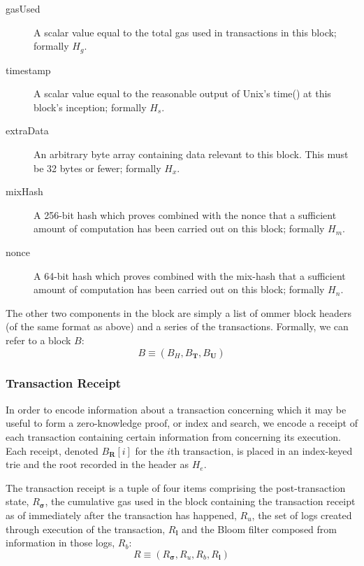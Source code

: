\documentclass[9pt,oneside]{amsart}
\begin{document}
\begin{multicols}{2}
\begin{description}
\item[gasUsed] A scalar value equal to the total gas used in transactions in this block; formally $H_g$.
\item[timestamp] A scalar value equal to the reasonable output of Unix's time() at this block's inception; formally $H_s$.
\item[extraData] An arbitrary byte array containing data relevant to this block. This must be 32 bytes or fewer; formally $H_x$.
\item[mixHash] A 256-bit hash which proves combined with the nonce that a sufficient amount of computation has been carried out on this block; formally $H_m$.
\item[nonce] A 64-bit hash which proves combined with the mix-hash that a sufficient amount of computation has been carried out on this block; formally $H_n$.
\end{description}

The other two components in the block are simply a list of ommer block headers (of the same format as above) and a series of the transactions. Formally, we can refer to a block $B$:
\begin{equation}
B \equiv (B_H, B_\mathbf{T}, B_\mathbf{U})
\end{equation}

\subsubsection{Transaction Receipt}

In order to encode information about a transaction concerning which it may be useful to form a zero-knowledge proof, or index and search, we encode a receipt of each transaction containing certain information from concerning its execution.
Each receipt, denoted $B_\mathbf{R}[i]$ for the $i$th transaction, is placed in an index-keyed trie and the root recorded in the header as $H_e$.

The transaction receipt is a tuple of four items comprising the post-transaction state, $R_{\boldsymbol{\sigma}}$, the cumulative gas used in the block containing the transaction receipt as of immediately after the transaction has happened, $R_u$, the set of logs created through execution of the transaction, $R_\mathbf{l}$ and the Bloom filter composed from information in those logs, $R_b$:
\begin{equation}
R \equiv (R_{\boldsymbol{\sigma}}, R_u, R_b, R_\mathbf{l})
\end{equation}


\end{multicols}
\end{document}
